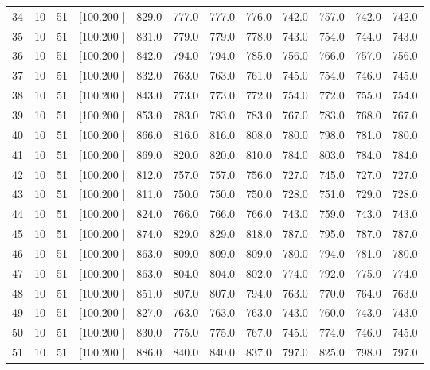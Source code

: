 \documentclass[12pt,a4paper]{article}
\begin{document}
\begin{center}
{\begin{tabular}{r r r r r r r r r r r r}
  34& 10& 51&[100.200   ]&   829.0&   777.0&   777.0&   776.0&   742.0&   757.0&   742.0&   742.0\\[-0.02in]
  35& 10& 51&[100.200   ]&   831.0&   779.0&   779.0&   778.0&   743.0&   754.0&   744.0&   743.0\\[-0.02in]
  36& 10& 51&[100.200   ]&   842.0&   794.0&   794.0&   785.0&   756.0&   766.0&   757.0&   756.0\\[-0.02in]
  37& 10& 51&[100.200   ]&   832.0&   763.0&   763.0&   761.0&   745.0&   754.0&   746.0&   745.0\\[-0.02in]
  38& 10& 51&[100.200   ]&   843.0&   773.0&   773.0&   772.0&   754.0&   772.0&   755.0&   754.0\\[-0.02in]
  39& 10& 51&[100.200   ]&   853.0&   783.0&   783.0&   783.0&   767.0&   783.0&   768.0&   767.0\\[-0.02in]
  40& 10& 51&[100.200   ]&   866.0&   816.0&   816.0&   808.0&   780.0&   798.0&   781.0&   780.0\\[-0.02in]
  41& 10& 51&[100.200   ]&   869.0&   820.0&   820.0&   810.0&   784.0&   803.0&   784.0&   784.0\\[-0.02in]
  42& 10& 51&[100.200   ]&   812.0&   757.0&   757.0&   756.0&   727.0&   745.0&   727.0&   727.0\\[-0.02in]
  43& 10& 51&[100.200   ]&   811.0&   750.0&   750.0&   750.0&   728.0&   751.0&   729.0&   728.0\\[-0.02in]
  44& 10& 51&[100.200   ]&   824.0&   766.0&   766.0&   766.0&   743.0&   759.0&   743.0&   743.0\\[-0.02in]
  45& 10& 51&[100.200   ]&   874.0&   829.0&   829.0&   818.0&   787.0&   795.0&   787.0&   787.0\\[-0.02in]
  46& 10& 51&[100.200   ]&   863.0&   809.0&   809.0&   809.0&   780.0&   794.0&   781.0&   780.0\\[-0.02in]
  47& 10& 51&[100.200   ]&   863.0&   804.0&   804.0&   802.0&   774.0&   792.0&   775.0&   774.0\\[-0.02in]
  48& 10& 51&[100.200   ]&   851.0&   807.0&   807.0&   794.0&   763.0&   770.0&   764.0&   763.0\\[-0.02in]
  49& 10& 51&[100.200   ]&   827.0&   763.0&   763.0&   763.0&   743.0&   760.0&   743.0&   743.0\\[-0.02in]
  50& 10& 51&[100.200   ]&   830.0&   775.0&   775.0&   767.0&   745.0&   774.0&   746.0&   745.0\\[-0.02in]
  51& 10& 51&[100.200   ]&   886.0&   840.0&   840.0&   837.0&   797.0&   825.0&   798.0&   797.0\\[-0.02in]

\end{tabular}}
\end{center}
\end{document}
